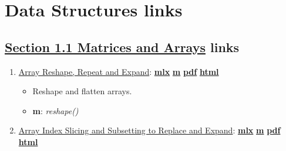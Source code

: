 \documentclass[
]{book}
\providecommand{\tightlist}{%
  \setlength{\itemsep}{0pt}\setlength{\parskip}{0pt}}
\begin{document}
\hypertarget{data-structures-links}{%
\section{Data Structures links}\label{data-structures-links}}

\hypertarget{section-1.1-matrices-and-arraysmatrices-and-arrays-links}{%
\subsection{\texorpdfstring{\protect\hyperlink{matrices-and-arrays}{Section 1.1 Matrices and Arrays} links}{Section 1.1 Matrices and Arrays links}}\label{section-1.1-matrices-and-arraysmatrices-and-arrays-links}}

\begin{enumerate}
\def\labelenumi{\arabic{enumi}.}
\tightlist
\item
  \href{https://fanwangecon.github.io/M4Econ/amto/array/htmlpdfm/fs_reshape.html}{Array Reshape, Repeat and Expand}: \href{https://github.com/FanWangEcon/M4Econ/blob/master/amto/array/fs_reshape.mlx}{\textbf{mlx}} \textbar{} \href{https://github.com/FanWangEcon/M4Econ/blob/master/amto/array/htmlpdfm/fs_reshape.m}{\textbf{m}} \textbar{} \href{https://github.com/FanWangEcon/M4Econ/blob/master/amto/array/htmlpdfm/fs_reshape.pdf}{\textbf{pdf}} \textbar{} \href{https://fanwangecon.github.io/M4Econ/amto/array/htmlpdfm/fs_reshape.html}{\textbf{html}}

  \begin{itemize}
  \tightlist
  \item
    Reshape and flatten arrays.
  \item
    \textbf{m}: \emph{reshape()}
  \end{itemize}
\item
  \href{https://fanwangecon.github.io/M4Econ/amto/array/htmlpdfm/fs_slicing.html}{Array Index Slicing and Subsetting to Replace and Expand}: \href{https://github.com/FanWangEcon/M4Econ/blob/master/amto/array/fs_slicing.mlx}{\textbf{mlx}} \textbar{} \href{https://github.com/FanWangEcon/M4Econ/blob/master/amto/array/htmlpdfm/fs_slicing.m}{\textbf{m}} \textbar{} \href{https://github.com/FanWangEcon/M4Econ/blob/master/amto/array/htmlpdfm/fs_slicing.pdf}{\textbf{pdf}} \textbar{} \href{https://fanwangecon.github.io/M4Econ/amto/array/htmlpdfm/fs_slicing.html}{\textbf{html}}


\end{enumerate}
\end{document}

